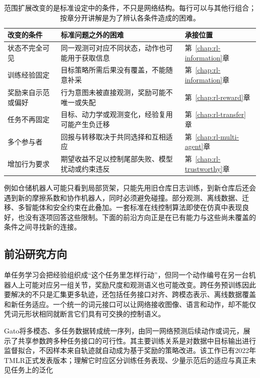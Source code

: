 \begin{table}[htbp]
  \centering\small
  \begin{tabularx}{\linewidth}{@{}>{\raggedright\arraybackslash}p{29mm}>{\raggedright\arraybackslash}X>{\raggedright\arraybackslash}p{32mm}@{}}
    \toprule
    改变的条件 & 标准问题之外的困难 & 承接位置\\
    \midrule
    状态不完全可见 & 同一观测可对应不同状态，动作也可能用于获取信息 & 第~\ref{chap:rl-information}章\\
    训练经验固定 & 目标策略所需后果没有覆盖，不能随意补采 & 第~\ref{chap:rl-information}章\\
    奖励来自示范或偏好 & 行为意图未被直接观测，奖励可能不唯一或失配 & 第~\ref{chap:rl-reward}章\\
    任务不再固定 & 目标、动力学或观测变化，经验复用可能产生负迁移 & 第~\ref{chap:rl-transfer}章\\
    多个参与者 & 回报与转移取决于共同选择和互相适应 & 第~\ref{chap:rl-multi-agent}章\\
    增加行为要求 & 期望收益不足以控制尾部失败、模型扰动或约束违反 & 第~\ref{chap:rl-trustworthy}章\\
    \bottomrule
  \end{tabularx}
  \caption{范围扩展改变的是标准设定中的条件，不只是网络结构。每行可以与其他行组合；按章分开讲解是为了辨认各条件造成的困难。}
  \label{tab:rl-overview-expansion}
\end{table}

例如仓储机器人可能只看到局部货架，只能先用旧仓库日志训练，到新仓库后还会遇到新的摩擦系数和协作机器人，同时必须避免碰撞。部分观测、离线数据、迁移、多智能体和安全约束在此叠加。一套标准在线控制算法即使在仿真中表现良好，也没有逐项回答这些限制。下面的前沿方向正是在已有能力与这些尚未覆盖的条件之间寻找新的连接。

\subsection{前沿研究方向}
\label{sec:rl-overview-frontiers}

单任务学习会把经验组织成“这个任务里怎样行动”，但同一个动作编号在另一台机器人上可能对应另一组关节，奖励尺度和观测语义也可能改变。跨任务预训练因此要解决的不只是汇集更多轨迹，还包括任务接口对齐、跨模态表示、离线数据覆盖和新任务适应。一个统一的词元接口可以让网络接收图像、语言和动作，却不能仅凭词元形状相同就断言它们具有可交换的控制语义。

Gato将多模态、多任务数据转成统一序列，由同一网络预测后续动作或词元，展示了共享参数跨多种任务接口的可行性。其主要训练关系是对数据中目标输出进行监督拟合，不因样本来自轨迹就自动成为基于奖励的策略改进。该工作已有2022年TMLR正式发表版本；理解它时应区分训练任务表现、少量示范后的适应与真正未见任务上的泛化

